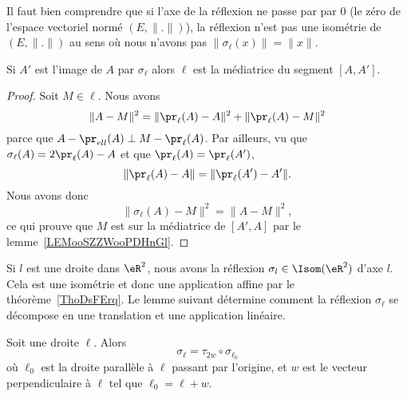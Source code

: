 \begin{remark}
    Il faut bien comprendre que si l'axe de la réflexion ne passe par par \( 0\) (le zéro de l'espace vectoriel normé \( (E,\| . \|)\)), la réflexion n'est pas une isométrie de \( (E,\| . \|)\) au sens où nous n'avons pas \( \| \sigma_{\ell}(x) \|=\| x \|\).
\end{remark}

\begin{lemma}       \label{LEMooTCIEooXdyuHu}
    Si \( A'\) est l'image de \( A\) par \( \sigma_{\ell}\) alors \( \ell\) est la médiatrice du segment \( [A,A']\).
\end{lemma}

\begin{proof}
    Soit \( M\in\ell\). Nous avons
    \begin{equation}
        \| A-M \|^2=\| \pr_{\ell}(A)-A \|^2+\| \pr_{\ell}(A)-M \|^2
    \end{equation}
    parce que \( A-\pr_{ell}(A)\perp M-\pr_{\ell}(A)\). Par ailleurs, vu que \( \sigma_{\ell}(A)=2\pr_{\ell}(A)-A\) et que \( \pr_{\ell}(A)=\pr_{\ell}(A')\),
    \begin{equation}
        \| \pr_{\ell}(A)-A \|=\| \pr_{\ell}(A')-A' \|.
    \end{equation}
    Nous avons donc
    \begin{equation}
        \| \sigma_{\ell}(A)-M \|^2=\| A-M \|^2,
    \end{equation}
    ce qui prouve que \( M\) est sur la médiatrice de \( [A',A]\) par le lemme~\ref{LEMooSZZWooPDHnGl}.
\end{proof}

\begin{normaltext}
    Si \( l\) est une droite dans \( \eR^2\), nous avons la réflexion \( \sigma_l\in\Isom(\eR^2)\) d'axe \( l\). Cela est une isométrie et donc une application affine par le théorème~\ref{ThoDsFErq}. Le lemme suivant détermine comment la réflexion \( \sigma_{\ell}\) se décompose en une translation et une application linéaire.
\end{normaltext}

\begin{lemma}   \label{LEMooVOJLooCFgdNG}
    Soit une droite \( \ell\). Alors
    \begin{equation}
        \sigma_{\ell}=\tau_{2w}\circ\sigma_{\ell_0}
    \end{equation}
    où \( \ell_0\) est la droite parallèle à \( \ell\) passant par l'origine, et \( w\) est le vecteur perpendiculaire à \( \ell\) tel que \( \ell_0=\ell+w\).
\end{lemma}

